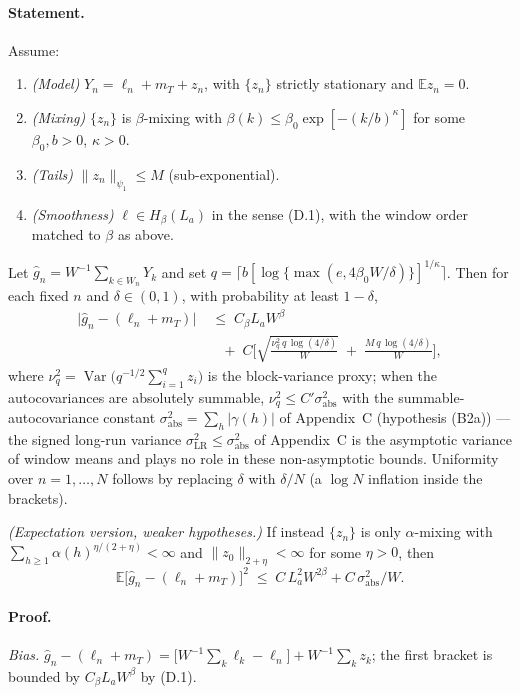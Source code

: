 \paragraph{Statement.} Assume:
\begin{enumerate}
\item \emph{(Model)} $Y_n=\ell_n+m_T+z_n$, with $\{z_n\}$ strictly stationary and $\mathbb{E}z_n=0$.
\item \emph{(Mixing)} $\{z_n\}$ is $\beta$-mixing with $\beta(k)\le\beta_0\exp[-(k/b)^{\kappa}]$ for some $\beta_0,b>0$, $\kappa>0$.
\item \emph{(Tails)} $\|z_n\|_{\psi_1}\le M$ (sub-exponential).
\item \emph{(Smoothness)} $\ell\in H_\beta(L_a)$ in the sense (D.1), with the window order matched to $\beta$ as above.
\end{enumerate}
Let $\hat g_n=W^{-1}\sum_{k\in W_n}Y_k$ and set $q=\lceil b[\log\{\max(e,4\beta_0W/\delta)\}]^{1/\kappa}\rceil$. Then for each fixed $n$ and $\delta\in(0,1)$, with probability at least $1-\delta$,
\begin{align*}
\big|\hat g_n-(\ell_n+m_T)\big|
&\;\le\;C_\beta L_a W^{\beta}\\
&\quad+\;C\Big[\sqrt{\tfrac{\nu_q^2\,q\,\log(4/\delta)}{W}}\;+\;\tfrac{M\,q\,\log(4/\delta)}{W}\Big], \tag{D.2}
\end{align*}
where $\nu_q^2=\operatorname{Var}\!\big(q^{-1/2}\sum_{i=1}^{q}z_i\big)$ is the block-variance proxy; when the autocovariances are absolutely summable, $\nu_q^2\le C'\sigma_{\mathrm{abs}}^2$ with the summable-autocovariance constant $\sigma_{\mathrm{abs}}^2=\sum_h|\gamma(h)|$ of Appendix~C (hypothesis (B2a)) --- the signed long-run variance $\sigma_{\mathrm{LR}}^2\le\sigma_{\mathrm{abs}}^2$ of Appendix~C is the asymptotic variance of window means and plays no role in these non-asymptotic bounds. Uniformity over $n=1,\dots,N$ follows by replacing $\delta$ with $\delta/N$ (a $\log N$ inflation inside the brackets).

\emph{(Expectation version, weaker hypotheses.)} If instead $\{z_n\}$ is only $\alpha$-mixing with $\sum_{h\ge1}\alpha(h)^{\eta/(2+\eta)}<\infty$ and $\|z_0\|_{2+\eta}<\infty$ for some $\eta>0$, then
\begin{equation}
\mathbb{E}\big[\hat g_n-(\ell_n+m_T)\big]^2\;\le\;C\,L_a^2W^{2\beta}+C\,\sigma_{\mathrm{abs}}^2/W. \tag{D.3}
\end{equation}

\paragraph{Proof.} \emph{Bias.} $\hat g_n-(\ell_n+m_T)=\big[W^{-1}\sum_k\ell_k-\ell_n\big]+W^{-1}\sum_k z_k$; the first bracket is bounded by $C_\beta L_aW^\beta$ by (D.1).

